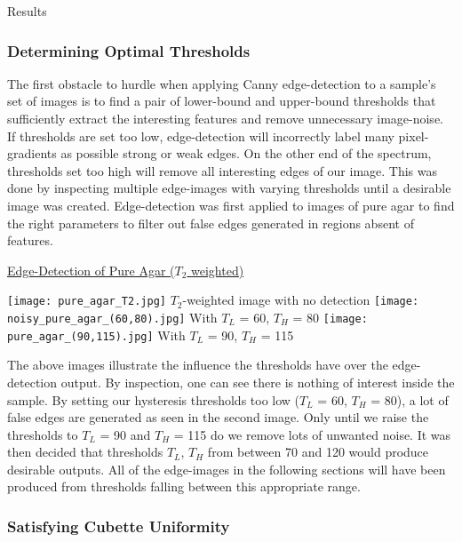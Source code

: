 \documentclass[a4paper,12pt]{article}
\begin{document}
\begin{section}{Results}
\subsubsection{Determining Optimal Thresholds} %

The first obstacle to hurdle when applying Canny edge-detection to a sample's set of images is to find a pair of lower-bound and upper-bound thresholds that sufficiently extract the interesting features and remove unnecessary image-noise. If thresholds are set too low, edge-detection will incorrectly label many pixel-gradients as possible strong or weak edges. On the other end of the spectrum, thresholds set too high will remove all interesting edges of our image. This was done by inspecting multiple edge-images with varying thresholds until a desirable image was created. Edge-detection was first applied to images of pure agar to find the right parameters to filter out false edges generated in regions absent of features.

\newpage
\begin{center} \underline{Edge-Detection of Pure Agar ($T_2$ weighted)} \end{center}
\begin{flushleft}
\texttt{[image: pure\_agar\_T2.jpg]}				\hspace{2cm}$T_2$-weighted image with no detection
\texttt{[image: noisy\_pure\_agar\_(60,80).jpg]}	\hspace{2cm}With $T_L$ = 60, $T_H$ = 80
\texttt{[image: pure\_agar\_(90,115).jpg]}			\hspace{2cm}With $T_L$ = 90, $T_H$ = 115
\end{flushleft}

The above images illustrate the influence the thresholds have over the edge-detection output. By inspection, one can see there is nothing of interest inside the sample. By setting our hysteresis thresholds too low ($T_L$ = 60, $T_H$ = 80), a lot of false edges are generated as seen in the second image. Only until we raise the thresholds to $T_L$ = 90 and $T_H$ = 115 do we remove lots of unwanted noise. It was then decided that thresholds $T_L$, $T_H$ from between 70 and 120 would produce desirable outputs. All of the edge-images in the following sections will have been produced from thresholds falling between this appropriate range.

\subsubsection{Satisfying Cubette Uniformity}


\end{section}
\end{document}
